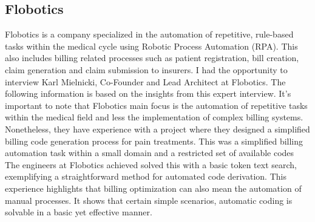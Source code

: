 \subsection{Flobotics}\label{subsec:flobotics}
Flobotics is a company specialized in the automation of repetitive, rule-based tasks within the medical cycle using Robotic Process Automation (RPA).
This also includes billing related processes such as patient registration, bill creation, claim generation and claim submission to insurers.
I had the opportunity to interview Karl Mielnicki, Co-Founder and Lead Architect at Flobotics.
The following information is based on the insights from this expert interview.
It's important to note that Flobotics main focus is the automation of repetitive tasks within the medical field and less the implementation of complex billing systems.
Nonetheless, they have experience with a project where they designed a simplified billing code generation process for pain treatments.
This was a simplified billing automation task within a small domain and a restricted set of available codes
The engineers at Flobotics achieved solved this with a basic token text search, exemplifying a straightforward method for automated code derivation.
This experience highlights that billing optimization can also mean the automation of manual processes.
It shows that certain simple scenarios, automatic coding is solvable in a basic yet effective manner.
